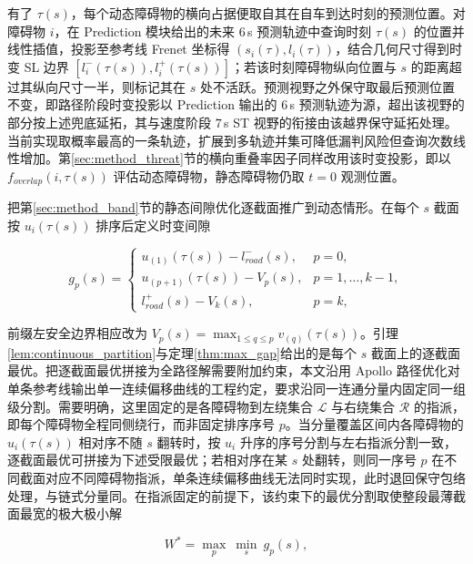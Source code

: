 \documentclass[a4paper,11pt]{ctexart}
\theoremstyle{definition}
\begin{document}
有了 $\tau(s)$，每个动态障碍物的横向占据便取自其在自车到达时刻的预测位置。对障碍物 $i$，在 Prediction 模块给出的未来 $6$\,s 预测轨迹中查询时刻 $\tau(s)$ 的位置并线性插值，投影至参考线 Frenet 坐标得 $(s_i(\tau), l_i(\tau))$，结合几何尺寸得到时变 SL 边界 $[l_i^{-}(\tau(s)), l_i^{+}(\tau(s))]$；若该时刻障碍物纵向位置与 $s$ 的距离超过其纵向尺寸一半，则标记其在 $s$ 处不活跃。预测视野之外保守取最后预测位置不变，即路径阶段时变投影以 Prediction 输出的 $6$\,s 预测轨迹为源，超出该视野的部分按上述兜底延拓，其与速度阶段 $7$\,s ST 视野的衔接由该越界保守延拓处理。当前实现取概率最高的一条轨迹，扩展到多轨迹并集可降低漏判风险但查询次数线性增加。第\ref{sec:method_threat}节的横向重叠率因子同样改用该时变投影，即以 $f_{overlap}(i, \tau(s))$ 评估动态障碍物，静态障碍物仍取 $t=0$ 观测位置。

把第\ref{sec:method_band}节的静态间隙优化逐截面推广到动态情形。在每个 $s$ 截面按 $u_i(\tau(s))$ 排序后定义时变间隙

\begin{equation}
    g_p(s) =
    \begin{cases}
        u_{(1)}(\tau(s)) - l_{road}^{-}(s), & p=0, \\[0.3em]
        u_{(p+1)}(\tau(s)) - V_p(s), & p=1,\ldots,k-1, \\[0.3em]
        l_{road}^{+}(s) - V_k(s), & p=k,
    \end{cases}
    \label{eq:time_varying_gap}
\end{equation}

前缀左安全边界相应改为 $V_p(s)=\max_{1\leq q\leq p} v_{(q)}(\tau(s))$。引理\ref{lem:continuous_partition}与定理\ref{thm:max_gap}给出的是每个 $s$ 截面上的逐截面最优。把逐截面最优拼接为全路径解需要附加约束，本文沿用 Apollo 路径优化对单条参考线输出单一连续偏移曲线的工程约定，要求沿同一连通分量内固定同一组级分割。需要明确，这里固定的是各障碍物到左绕集合 $\mathcal{L}$ 与右绕集合 $\mathcal{R}$ 的指派，即每个障碍物全程同侧绕行，而非固定排序序号 $p$。当分量覆盖区间内各障碍物的 $u_i(\tau(s))$ 相对序不随 $s$ 翻转时，按 $u_i$ 升序的序号分割与左右指派分割一致，逐截面最优可拼接为下述受限最优；若相对序在某 $s$ 处翻转，则同一序号 $p$ 在不同截面对应不同障碍物指派，单条连续偏移曲线无法同时实现，此时退回保守包络处理，与链式分量同。在指派固定的前提下，该约束下的最优分割取使整段最薄截面最宽的极大极小解

\begin{equation}
    W^{*} = \max_{p}\ \min_{s}\ g_p(s),
    \label{eq:time_varying_opt}
\end{equation}
\end{document}
